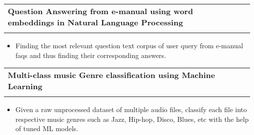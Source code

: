 \documentclass[a4paper,11pt]{article}
\makeatletter
\newcommand{\resumeProject}[4]{
\vspace{0.4mm}
\item
    \begin{tabular*}{0.98\textwidth}[t]{l@{\extracolsep{\fill}}r}
        \textbf{#1} & \textit{\footnotesize{#3}} \\
        \footnotesize{\textit{#2}} & \footnotesize{#4}
    \end{tabular*}
    \vspace{-2.4mm}
}
\newcommand{\resumeItemListStart}{\begin{justify}\begin{itemize}[leftmargin=3ex, rightmargin=2ex, noitemsep,labelsep=1.2mm,itemsep=0mm]\small}
\newcommand{\resumeItemListEnd}{\end{itemize}\end{justify}\vspace{-2mm}}
\makeatother
\begin{document}
    \resumeProject
      {Question Answering from e-manual using word embeddings in Natural Language Processing}{}    {\textnormal{\href{https://github.com/Nusart/question-answering-NLP}{\Large \faGithub}}}{}
      \vspace{-5.5mm}
      \resumeItemListStart
        \item {Finding the most relevant question text corpus of user query from e-manual faqs and thus finding their corresponding answers.}
    \resumeItemListEnd
    
    \resumeProject
      {Multi-class music Genre classification using Machine Learning}
      {}     {\textnormal{\href{https://github.com/Nusart/music-genre-classification}{\Large \faGithub}}}{}
      \vspace{-5.5mm}
      \resumeItemListStart
        \item {Given a raw unprocessed dataset of multiple audio files, classify each file into respective music genres such as Jazz, Hip-hop, Disco, Blues, etc with the help of tuned ML models.}
    \resumeItemListEnd
    
    
      
\end{document}

